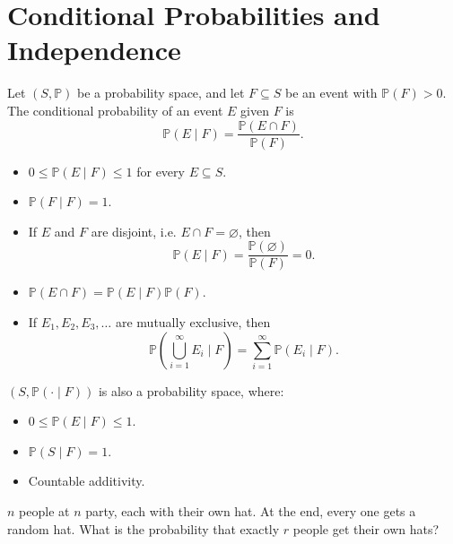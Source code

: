 \chapter{Conditional Probabilities and Independence}
\begin{definition}
    Let \((S, \mathbb{P} )\) be a probability space, and let \(F \subseteq S\) be an event with \(\mathbb{P} (F) > 0\). The conditional probability of an event \(E\) given \(F\) is 
    \[
        \mathbb{P} (E \mid F) = \frac{\mathbb{P} (E \cap F)}{\mathbb{P} (F)}.
    \]     
\end{definition}

\begin{proposition}
    \hfill
    \begin{itemize}
        \item [(1)] \(0 \le \mathbb{P} (E \mid F) \le 1\) for every \(E \subseteq S\). 
        \item [(2)] \(\mathbb{P} (F \mid F) = 1\).   
        \item [(3)] If \(E\) and \(F\) are disjoint, i.e. \(E \cap F = \varnothing\), then
        \[
            \mathbb{P} (E \mid F) = \frac{\mathbb{P} (\varnothing )}{\mathbb{P} (F)} = 0.
        \]
        \item [(4)] \(\mathbb{P} (E \cap F) = \mathbb{P} (E \mid F) \mathbb{P} (F)\). 
        \item [(5)] If \(E_1, E_2, E_3, \dots \) are mutually exclusive, then 
        \[
            \mathbb{P} \left( \bigcup_{i=1}^{\infty} E_i \mid F  \right) = \sum_{i=1}^{\infty } \mathbb{P} (E_i \mid F).  
        \]
    \end{itemize}
\end{proposition}

\begin{corollary}
    \((S, \mathbb{P} \left( \cdot \mid F \right) )\) is also a probability space, where: 
    \begin{itemize}
        \item \(0 \le \mathbb{P} (E \mid F) \le 1\).
        \item \(\mathbb{P} (S \mid F) = 1\).
        \item Countable additivity.   
    \end{itemize} 
\end{corollary}

\begin{eg}
    \(n\) people at \(n\) party, each with their own hat. At the end, every one gets a random hat. What is the probability that exactly \(r\) people get their own hats?  
\end{eg}

